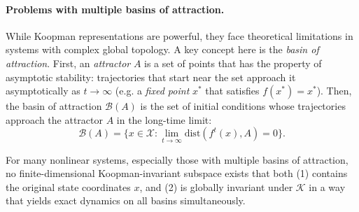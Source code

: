 
\paragraph{Problems with multiple basins of attraction.}

While Koopman representations are powerful, they face theoretical limitations in systems with complex global topology. A key concept here is the \emph{basin of attraction}. First, an \emph{attractor} $A$ is a set of points that has the property of asymptotic stability: trajectories that start near the set approach it asymptotically as $t \to \infty$ 
(e.g. a \emph{fixed point} $x^\ast$ that satisfies $f(x^\ast) = x^\ast$). Then, the basin of attraction $\mathcal{B}(A)$ is the set of initial conditions whose trajectories approach the attractor $A$ in the long-time limit:
\begin{equation} 
\mathcal{B}(A) = \{ x \in \mathcal{X} : \lim_{t \to \infty} \text{dist}(f^t(x), A) = 0 \}.
\end{equation}

For many nonlinear systems, especially those with multiple basins of attraction, no finite-dimensional Koopman-invariant subspace exists that both (1) contains the original state coordinates $x$, and (2) is globally invariant under $\mathcal{K}$ in a way that yields exact dynamics on all basins simultaneously.

